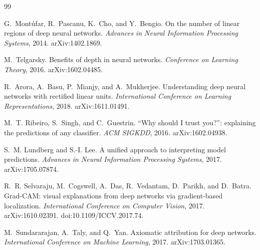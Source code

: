 \documentclass[11pt]{article}
\begin{document}
\begin{thebibliography}{99}

G.~Mont\'ufar, R.~Pascanu, K.~Cho, and Y.~Bengio.
\newblock On the number of linear regions of deep neural networks.
\newblock \emph{Advances in Neural Information Processing Systems}, 2014.
\newblock arXiv:1402.1869.

M.~Telgarsky.
\newblock Benefits of depth in neural networks.
\newblock \emph{Conference on Learning Theory}, 2016.
\newblock arXiv:1602.04485.

R.~Arora, A.~Basu, P.~Mianjy, and A.~Mukherjee.
\newblock Understanding deep neural networks with rectified linear units.
\newblock \emph{International Conference on Learning Representations}, 2018.
\newblock arXiv:1611.01491.

M.~T. Ribeiro, S.~Singh, and C.~Guestrin.
\newblock ``Why should I trust you?'': explaining the predictions of any
  classifier.
\newblock \emph{ACM SIGKDD}, 2016.
\newblock arXiv:1602.04938.

S.~M. Lundberg and S.-I. Lee.
\newblock A unified approach to interpreting model predictions.
\newblock \emph{Advances in Neural Information Processing Systems}, 2017.
\newblock arXiv:1705.07874.

R.~R. Selvaraju, M.~Cogswell, A.~Das, R.~Vedantam, D.~Parikh, and D.~Batra.
\newblock Grad-CAM: visual explanations from deep networks via gradient-based
  localization.
\newblock \emph{International Conference on Computer Vision}, 2017.
\newblock arXiv:1610.02391. doi:10.1109/ICCV.2017.74.

M.~Sundararajan, A.~Taly, and Q.~Yan.
\newblock Axiomatic attribution for deep networks.
\newblock \emph{International Conference on Machine Learning}, 2017.
\newblock arXiv:1703.01365.

\end{thebibliography}
\end{document}
